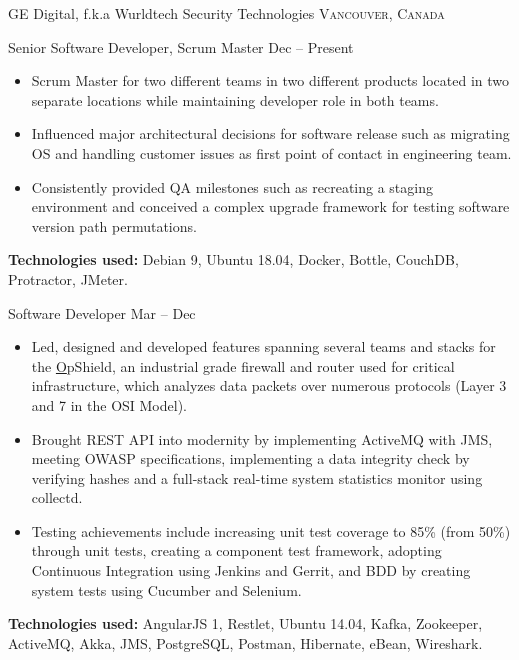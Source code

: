 \documentclass[10pt,a4paper]{article}
\begin{document}
\headedsection  %
  {{GE Digital, f.k.a Wurldtech Security Technologies}}
  {\textsc{Vancouver, Canada}} {%
  \headedsubsection
    {Senior Software Developer, Scrum Master}
    {Dec  -- Present}
   {\noindent
    
  \begin{itemize}  
\item Scrum Master for two different teams in two different products located in two separate locations while maintaining developer role in both teams.
\item Influenced major architectural decisions for software release such as migrating OS and handling customer issues as first point of contact in engineering team.
\item Consistently provided QA milestones such as recreating a staging environment and conceived a complex upgrade framework for testing software version path permutations. 
\end{itemize}
\textbf{Technologies used:} Debian 9, Ubuntu 18.04, Docker, Bottle, CouchDB, Protractor, JMeter.}
    
  \headedsubsection
    {Software Developer}
    {Mar  -- Dec }
    {\noindent\begin{itemize}  
\item Led, designed and developed features spanning several teams and stacks for the \href{https://www.ge.com/digital/asset/opshield-ge-digital}OpShield, an industrial
grade firewall and router used for critical infrastructure, which analyzes data packets over numerous protocols (Layer
3 and 7 in the OSI Model).
\item Brought REST API into modernity by implementing ActiveMQ
with JMS, meeting OWASP specifications, implementing a data integrity check by verifying hashes and a full-stack real-time system statistics monitor using collectd.
\item Testing achievements include increasing unit test coverage to 85\% (from 50\%) through unit tests, creating a component test framework, adopting Continuous Integration using Jenkins and Gerrit, and BDD by creating system tests using Cucumber and Selenium.
\end{itemize}
\textbf{Technologies used:} AngularJS 1, Restlet, Ubuntu 14.04, Kafka, Zookeeper, ActiveMQ, Akka, JMS, PostgreSQL, Postman, Hibernate, eBean, Wireshark.}
}
\end{document}

